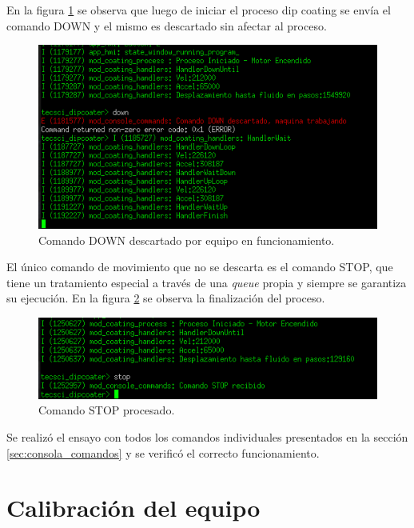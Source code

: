 En la figura \ref{fig:consola_comando_ok} se observa que luego de iniciar el proceso dip coating se envía el comando DOWN y el mismo es descartado sin afectar al proceso.

\begin{figure}[h!]
	\centering
	\includegraphics[width=1\textwidth]{./Figures/consola_4.png}
	\caption{Comando DOWN descartado por equipo en funcionamiento.}
	\label{fig:consola_comando_ok}
\end{figure}

El único comando de movimiento que no se descarta es el comando STOP, que tiene un tratamiento especial a través de una \textit{queue} propia y siempre se garantiza su ejecución. En la figura \ref{fig:consola_comando_false} se observa la finalización del proceso.

\begin{figure}[h!]
	\centering
	\includegraphics[width=1\textwidth]{./Figures/consola_5.png}
	\caption{Comando STOP procesado.}
	\label{fig:consola_comando_false}
\end{figure}
 
Se realizó el ensayo con todos los comandos individuales  presentados en la sección \ref{sec:consola_comandos} y se verificó el correcto funcionamiento.  
  
\section{Calibración del equipo}
\label{sec:calibración}
